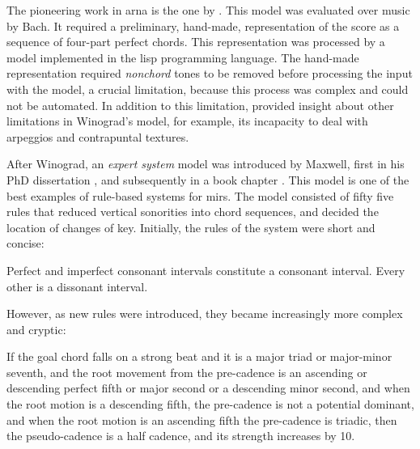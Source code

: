 


The pioneering work in \gls{arna} is the one by
\textcite{winograd1968linguistics}. This model was evaluated
over music by Bach. It required a preliminary, hand-made,
representation of the score as a sequence of four-part
perfect chords. This representation was processed by a model
implemented in the \gls{lisp} programming language. The
hand-made representation required \emph{nonchord} tones to
be removed before processing the input with the model, a
crucial limitation, because this process was complex and
could not be automated. In addition to this limitation,
\textcite{temperley1997algorithm} provided insight about
other limitations in Winograd's model, for example, its
incapacity to deal with arpeggios and contrapuntal textures.

After Winograd, an \emph{expert system} model was introduced
by Maxwell, first in his PhD dissertation
\parencite{maxwell1984artificial}, and subsequently in a
book chapter \parencite{maxwell1992expert}. This model is
one of the best examples of rule-based systems for
\glspl{mir}. The model consisted of fifty five rules that
reduced vertical sonorities into chord sequences, and
decided the location of changes of key. Initially, the rules
of the system were short and concise:

\begin{italicquotes}
    Perfect and imperfect consonant intervals constitute a
    consonant interval. Every other is a dissonant interval.
\end{italicquotes}

However, as new rules were introduced, they became
increasingly more complex and cryptic:

\begin{italicquotes}
    If the goal chord falls on a strong beat and it is a
    major triad or major-minor seventh, and the root
    movement from the pre-cadence is an ascending or
    descending perfect fifth or major second or a descending
    minor second, and when the root motion is a descending
    fifth, the pre-cadence is not a potential dominant, and
    when the root motion is an ascending fifth the
    pre-cadence is triadic, then the pseudo-cadence is a
    half cadence, and its strength increases by 10.
\end{italicquotes}

